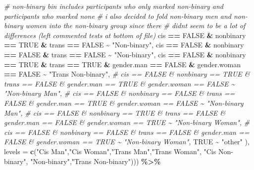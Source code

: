 \documentclass[12pt,twoside]{reedthesis}
\newenvironment{Shaded}{\begin{snugshade}}{\end{snugshade}}
\newcommand{\CommentTok}[1]{\textcolor[rgb]{0.56,0.35,0.01}{\textit{#1}}}
\newcommand{\DataTypeTok}[1]{\textcolor[rgb]{0.13,0.29,0.53}{#1}}
\newcommand{\KeywordTok}[1]{\textcolor[rgb]{0.13,0.29,0.53}{\textbf{#1}}}
\newcommand{\NormalTok}[1]{#1}
\newcommand{\OperatorTok}[1]{\textcolor[rgb]{0.81,0.36,0.00}{\textbf{#1}}}
\newcommand{\OtherTok}[1]{\textcolor[rgb]{0.56,0.35,0.01}{#1}}
\newcommand{\StringTok}[1]{\textcolor[rgb]{0.31,0.60,0.02}{#1}}
\begin{document}
\begin{Shaded}
\begin{Highlighting}[]
      \CommentTok{\# non{-}binary bin includes participants who only marked non{-}binary and participants who marked none}
      \CommentTok{\# i also decided to fold non{-}binary men and non{-}binary women into the non{-}binary group since there}
      \CommentTok{\# didn\textquotesingle{}t seem to be a lot of differences (left commented tests at bottom of file)}
\NormalTok{      cis }\OperatorTok{==}\StringTok{ }\OtherTok{FALSE} \OperatorTok{\&}\StringTok{ }\NormalTok{nonbinary }\OperatorTok{==}\StringTok{ }\OtherTok{TRUE} \OperatorTok{\&}\StringTok{ }\NormalTok{trans }\OperatorTok{==}\StringTok{ }\OtherTok{FALSE} \OperatorTok{\textasciitilde{}}\StringTok{ "Non{-}binary"}\NormalTok{,}
\NormalTok{      cis }\OperatorTok{==}\StringTok{ }\OtherTok{FALSE} \OperatorTok{\&}\StringTok{ }\NormalTok{nonbinary }\OperatorTok{==}\StringTok{ }\OtherTok{FALSE} \OperatorTok{\&}\StringTok{ }\NormalTok{trans }\OperatorTok{==}\StringTok{ }\OtherTok{FALSE} \OperatorTok{\textasciitilde{}}\StringTok{ "Non{-}binary"}\NormalTok{,}
\NormalTok{      cis }\OperatorTok{==}\StringTok{ }\OtherTok{FALSE} \OperatorTok{\&}\StringTok{ }\NormalTok{nonbinary }\OperatorTok{==}\StringTok{ }\OtherTok{TRUE} \OperatorTok{\&}\StringTok{ }\NormalTok{trans }\OperatorTok{==}\StringTok{ }\OtherTok{TRUE} \OperatorTok{\&}\StringTok{ }\NormalTok{gender.man }\OperatorTok{==}\StringTok{ }\OtherTok{FALSE} \OperatorTok{\&}\StringTok{ }\NormalTok{gender.woman }\OperatorTok{==}\StringTok{ }\OtherTok{FALSE} \OperatorTok{\textasciitilde{}}\StringTok{ "Trans Non{-}binary"}\NormalTok{,}
      \CommentTok{\# cis == FALSE \& nonbinary == TRUE \& trans == FALSE \& gender.man == TRUE \& gender.woman == FALSE \textasciitilde{} "Non{-}binary Man",}
      \CommentTok{\# cis == FALSE \& nonbinary == FALSE \& trans == FALSE \& gender.man == TRUE \& gender.woman == FALSE \textasciitilde{} "Non{-}binary Man",}
      \CommentTok{\# cis == FALSE \& nonbinary == TRUE \& trans == FALSE \& gender.man == FALSE \& gender.woman == TRUE \textasciitilde{} "Non{-}binary Woman",}
      \CommentTok{\# cis == FALSE \& nonbinary == FALSE \& trans == FALSE \& gender.man == FALSE \& gender.woman == TRUE \textasciitilde{} "Non{-}binary Woman",}
      \OtherTok{TRUE} \OperatorTok{\textasciitilde{}}\StringTok{ "other"}
\NormalTok{    ), }\DataTypeTok{levels =} \KeywordTok{c}\NormalTok{(}\StringTok{"Cis Man"}\NormalTok{,}\StringTok{"Cis Woman"}\NormalTok{,}\StringTok{"Trans Man"}\NormalTok{,}\StringTok{"Trans Woman"}\NormalTok{, }\StringTok{"Cis Non{-}binary"}\NormalTok{, }\StringTok{"Non{-}binary"}\NormalTok{,}\StringTok{"Trans Non{-}binary"}\NormalTok{))) }\OperatorTok{\%\textgreater{}\%}

\end{Highlighting}
\end{Shaded}
\end{document}
